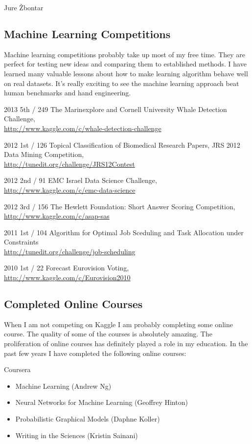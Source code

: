 \documentclass[12pt,a4paper]{article}
\begin{document}
\begin{cv}{Jure Žbontar}
\subsection*{Machine Learning Competitions}
Machine learning competitions probably take up most of my free time.
They are perfect for testing new ideas and comparing them to established
methods. I have learned many valuable lessons about how to make learning
algorithm behave well on real datasets. It's really exciting to see the machine
learning approach beat human benchmarks and hand engineering.

\begin{cvlist}{}
\item[2013 \quad 5th / 249] The Marinexplore and Cornell University Whale Detection Challenge, \\
\url{http://www.kaggle.com/c/whale-detection-challenge}
\item[2012 \quad 1st / 126] Topical Classification of Biomedical Research Papers, 
JRS 2012 Data Mining Competition, \\
\url{http://tunedit.org/challenge/JRS12Contest}
\item[2012 \quad 2nd / 91] EMC Israel Data Science Challenge, \\
\url{http://www.kaggle.com/c/emc-data-science}
\item[2012 \quad 3rd / 156] The Hewlett Foundation: Short Answer Scoring Competition, \\
\url{http://www.kaggle.com/c/asap-sas}
\item[2011 \quad 1st / 104] Algorithm for Optimal Job Sceduling and Task Allocation under Constraints \\
\url{http://tunedit.org/challenge/job-scheduling}
\item[2010 \quad 1st / 22] Forecast Eurovision Voting, \\
\url{http://www.kaggle.com/c/Eurovision2010}
\end{cvlist}

\subsection*{Completed Online Courses}
When I am not competing on Kaggle I am probably completing some online course.
The quality of some of the courses is absolutely amazing. The proliferation of
online courses has definitely played a role in my education. In the past few
years I have completed the following online courses:

\begin{cvlist}{}
\item[Coursera] 
\begin{itemize}
\item Machine Learning (Andrew Ng)
\item Neural Networks for Machine Learning (Geoffrey Hinton)
\item Probabilistic Graphical Models (Daphne Koller)
\item Writing in the Sciences (Kristin Sainani)
\end{itemize}


\end{cvlist}
\end{cv}
\end{document}
